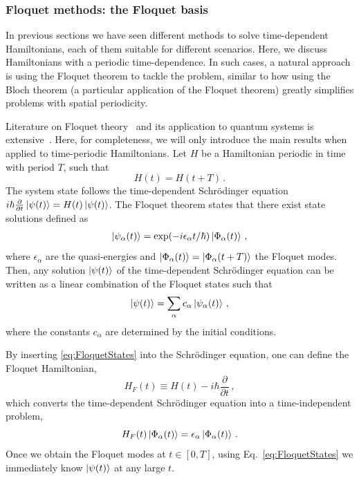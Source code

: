 \documentclass[preprint,3p,sort&compress]{elsarticle}
\begin{document}
\subsubsection{Floquet methods: the Floquet basis}


In previous sections we have seen different methods to solve time-dependent Hamiltonians, each of them suitable for different scenarios.
Here, we discuss Hamiltonians with a periodic time-dependence. In such cases, a natural approach is using the Floquet theorem to tackle the problem, similar to how using the Bloch theorem (a particular application of the Floquet theorem) greatly simplifies problems with spatial periodicity.

Literature on Floquet theory~\cite{Floquet1883} and its application to quantum systems is extensive~\cite{Shirley1965,Grifoni1998, Creffield2003}. Here, for completeness, we will only introduce the main results when applied to time-periodic Hamiltonians. %
Let $H$ be a Hamiltonian periodic in time with period $T$, such that
\begin{equation}
H(t) = H(t+ T) \, .
\end{equation}
The system state follows the time-dependent Schr\"odinger equation $i\hbar\frac{\partial}{\partial t} \ket{\psi(t)} = H(t) \ket{\psi(t)}$.
The Floquet theorem states that there exist state solutions defined as
\begin{align}\label{eq:FloquetStates}
\ket{\psi_{\alpha}(t)} = \exp (-i\epsilon_{\alpha} t / \hbar) \ket{\Phi_{\alpha} ( t)} \, ,
\end{align}
where $\epsilon_{\alpha}$ are the quasi-energies and $\ket{\Phi_{\alpha} (t)} = \ket{\Phi_{\alpha} (t +T)}$ the Floquet modes. Then, any solution $\ket{\psi(t)}$ of the time-dependent Schrödinger equation can be written as a linear combination of the Floquet states such that
\begin{equation}
\ket{\psi( t)} = \sum_{\alpha} c_{\alpha} \ket{\psi_{\alpha}(t)} \, ,
\end{equation}
where the constants $c_{\alpha}$ are determined by the initial conditions.

By inserting \eqref{eq:FloquetStates} into the Schrödinger equation, one can define the Floquet Hamiltonian,
\begin{equation}
H_F (t) \equiv H(t) - i\hbar \frac{\partial}{\partial t}\, ,
\end{equation}
which converts the time-dependent Schr\"odinger equation into a time-independent problem,
\begin{equation}\label{eq:H_F}
H_F (t) \ket{ \Phi_{\alpha}(t) } = \epsilon_{\alpha} \ket{ \Phi_{\alpha}(t) } \, .
\end{equation}
Once we obtain the Floquet modes at $t \in [0, T]$, using Eq.~\eqref{eq:FloquetStates} we immediately know $\ket{\psi(t)}$ at any large $t$. 
\end{document}

